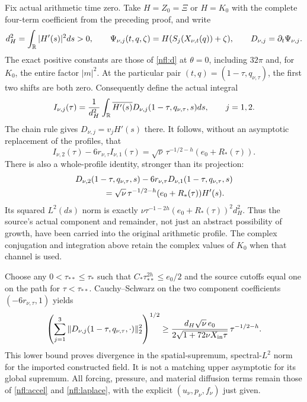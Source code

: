 Fix actual arithmetic time zero. Take $H=Z_0=\Xi$ or $H=K_0$ with
the complete four-term coefficient from the preceding proof, and write
\[
 d_H^2=\int_\mathbb R|H'(s)|^2ds>0,\qquad
 \Psi_{\nu,j}(t,q,\zeta)=H(S_j(X_{\nu,t}(q))+\zeta),
 \qquad D_{\nu,j}=\partial_t\Psi_{\nu,j}.
\]
The exact positive constants are those of \eqref{nfl:d} at $\theta=0$,
including $32\pi$ and, for $K_0$, the entire factor $|m|^2$.
At the particular pair $(t,q)=(1-\tau,q_{\nu,\tau})$, the first two
shifts are both zero. Consequently define the actual integral
\[
 I_{\nu,j}(\tau)=\frac{1}{d_H^2}\int_\mathbb R
       \overline{H'(s)}D_{\nu,j}(1-\tau,q_{\nu,\tau},s)ds,
 \qquad j=1,2.
\]
The chain rule gives $D_{\nu,j}=v_jH'(s)$ there. It follows, without
an asymptotic replacement of the profiles, that
\begin{equation}
 I_{\nu,2}(\tau)-6r_{\nu,\tau}I_{\nu,1}(\tau)
 =\sqrt\nu\,\tau^{-1/2-h}(e_0+R_*(\tau)).
 \label{naw:integralblowup}
\end{equation}
There is also a whole-profile identity, stronger than its projection:
\begin{equation}
 \begin{split}
 &D_{\nu,2}(1-\tau,q_{\nu,\tau},s)
      -6r_{\nu,\tau}D_{\nu,1}(1-\tau,q_{\nu,\tau},s)\\
 &\hspace{12mm}=\sqrt\nu\,\tau^{-1/2-h}
                      (e_0+R_*(\tau))H'(s).
 \end{split}
 \label{naw:profileblowup}
\end{equation}
Its squared $L^2(ds)$ norm is exactly
$\nu\tau^{-1-2h}(e_0+R_*(\tau))^2d_H^2$.
Thus the source's actual component and remainder, not just an abstract
possibility of growth, have been carried into the original arithmetic
profile. The complex conjugation and integration above retain the
complex values of $K_0$ when that channel is used.

Choose any $0<\tau_{**}\leq\tau_*$ such that
$C_*\tau_{**}^{2h}\leq e_0/2$ and the source cutoffs equal one on
the path for $\tau<\tau_{**}$. Cauchy--Schwarz on the two component
coefficients $(-6r_{\nu,\tau},1)$ yields
\begin{equation}
 \left(\sum_{j=1}^3\|D_{\nu,j}
              (1-\tau,q_{\nu,\tau},\cdot)\|_2^2\right)^{1/2}
 \geq
 \frac{d_H\sqrt\nu\,e_0}
      {2\sqrt{1+72\nu X_{\rm in}\tau}}\,
              \tau^{-1/2-h}.
 \label{naw:lower}
\end{equation}
This lower bound proves divergence in the spatial-supremum,
spectral-$L^2$ norm for the imported constructed field. It is not a
matching upper asymptotic for its global supremum. All forcing,
pressure, and material diffusion terms remain those of
\eqref{nfl:accel} and \eqref{nfl:laplace}, with the explicit
$(u_\nu,p_\nu,f_\nu)$ just given.

